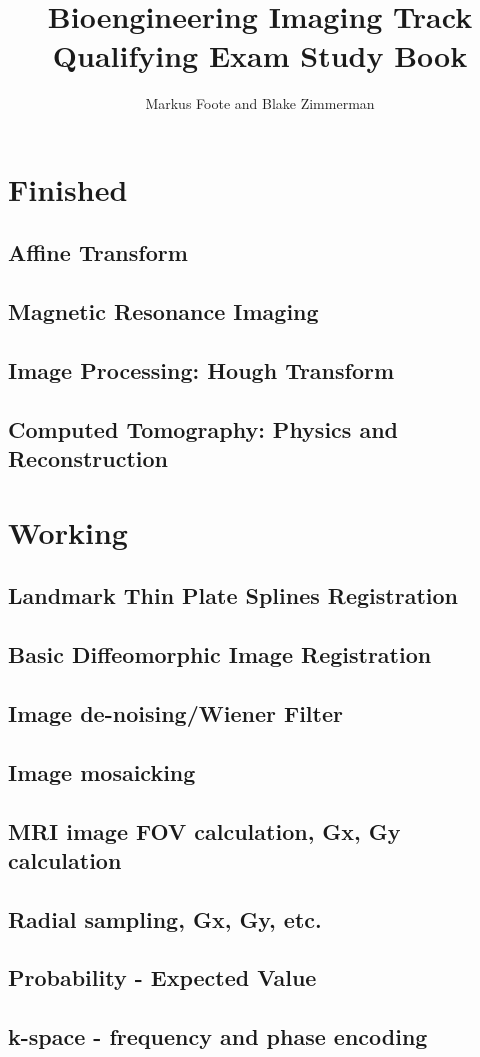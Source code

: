 \documentclass{report}
\title{Bioengineering Imaging Track Qualifying Exam Study Book}
\author{Markus Foote and Blake Zimmerman}
\begin{document}
	\maketitle
	\setcounter{tocdepth}{1} %
	\tableofcontents
	\part{Finished}
	\chapter{Affine Transform}
	
	
	\chapter{Magnetic Resonance Imaging}
	
	
	\chapter{Image Processing: Hough Transform}
	
	
	\chapter{Computed Tomography: Physics and Reconstruction}
	
	\part{Working}
	\chapter{Landmark Thin Plate Splines Registration}
	\chapter{Basic Diffeomorphic Image Registration}
	
	\chapter{Image de-noising/Wiener Filter}
	
	\chapter{Image mosaicking}
	
	\chapter{MRI image FOV calculation, Gx, Gy calculation}
	
	\chapter{Radial sampling, Gx, Gy, etc.}
	
	\chapter{Probability - Expected Value}
	
	\chapter{k-space - frequency and phase encoding}
	
	
	
	
	
	
		
\end{document}
